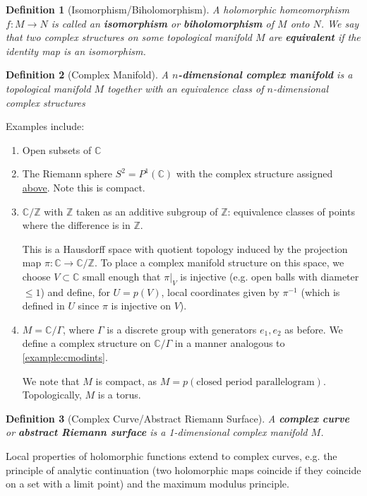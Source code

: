\documentclass{article}
\newcommand{\mbb}[1]{\mathbb{#1}}
\newtheorem{definition}{Definition}
\begin{document}
\begin{definition}[Isomorphism/Biholomorphism]
A holomorphic homeomorphism \(f: M \to N\) is called an \textbf{isomorphism} or \textbf{biholomorphism} of \(M\) onto \(N\). We say that two complex structures on some topological manifold \(M\) are \textbf{equivalent} if the identity map is an isomorphism.
\end{definition}

\begin{definition}[Complex Manifold]
A \textbf{\(n\)-dimensional complex manifold} is a topological manifold \(M\) together with an equivalence class of \(n\)-dimensional complex structures
\end{definition}

Examples include:
\begin{enumerate}

  \item Open subsets of \(\mbb{C}\)

  \item The Riemann sphere \(S^2 = P^1(\mbb{C})\) with the complex structure assigned \hyperref[example:riemann_complex_structure]{above}. Note this is compact.

  \item \(\mbb{C}/\mbb{Z}\) with \(\mbb{Z}\) taken as an additive subgroup of \(\mbb{Z}\): equivalence classes of points where the difference is in \(\mbb{Z}\).

  This is a Hausdorff space with quotient topology induced by the projection map \(\pi: \mbb{C} \to \mbb{C}/\mbb{Z}\). To place a complex manifold structure on this space, we choose \(V \subset \mbb{C}\) small enough that \(\pi|_V\) is injective (e.g. open balls with diameter \(\leq 1\)) and define, for \(U = p(V)\), local coordinates given by \(\pi^{-1}\) (which is defined in \(U\) since \(\pi\) is injective on \(V\)).
  \label{example:cmodints}

  \item \(M = \mbb{C}/\Gamma\), where \(\Gamma\) is a discrete group with generators \(e_1, e_2\) as before. We define a complex structure on \(\mbb{C}/\Gamma\) in a manner analogous to \ref{example:cmodints}.

  We note that \(M\) is compact, as \(M = p(\text{closed period parallelogram})\). Topologically, \(M\) is a torus.

\end{enumerate}

\begin{definition}[Complex Curve/Abstract Riemann Surface]
A \textbf{complex curve} or \textbf{abstract Riemann surface} is a 1-dimensional complex manifold \(M\).
\end{definition}
Local properties of holomorphic functions extend to complex curves, e.g. the principle of analytic continuation (two holomorphic maps coincide if they coincide on a set with a limit point) and the maximum modulus principle.
\end{document}
